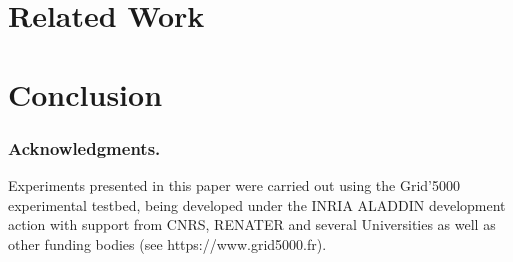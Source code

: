 \documentclass[runningheads,a4paper]{llncs2e/llncs}
\begin{document}
\section{Related Work}
\label{sec:related}


\section{Conclusion}
\label{sec:con}


%
%
%
%
%
%
%

%
%

%

\subsubsection{Acknowledgments.}
Experiments presented in this paper were carried out using the Grid'5000
experimental testbed, being developed under the INRIA ALADDIN development
 action with support from CNRS, RENATER and several Universities as well as
  other funding bodies (see https://www.grid5000.fr).



\end{document}
